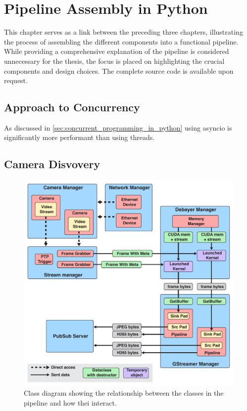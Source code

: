 
\chapter{Pipeline Assembly in Python}
\label{chap:pipeline}
This chapter serves as a link between the preceding three chapters, illustrating the process of assembling the different components into a functional pipeline.
While providing a comprehensive explanation of the pipeline is considered unnecessary for the thesis, the focus is placed on highlighting the crucial components and design choices.
The complete source code is available upon request.



\section{Approach to Concurrency}
As discussed in \ref{sec:concurrent_programming_in_python} using \gls{asyncio} is significantly more performant than using threads.

\section{Camera Disvovery}
\label{sec:discovery}

\begin{figure}
    \centering
    \includegraphics[width=\textwidth]{figures/object_overview.pdf}
    \caption{Class diagram showing the relationship between the classes in the pipeline and how thei interact.}
    \label{fig:pipeline_current}
\end{figure}

